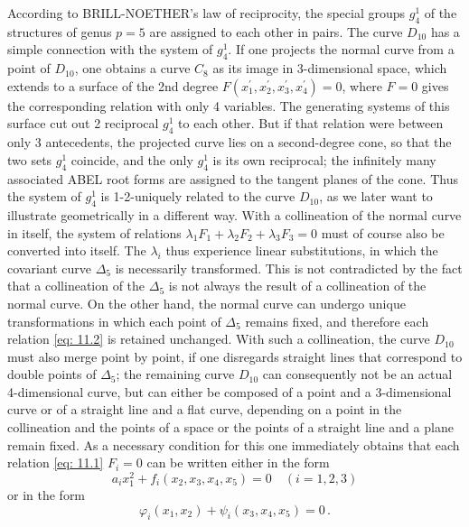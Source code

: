 \documentclass[leqno]{article}
\begin{document}
According to BRILL-NOETHER's law of reciprocity, the special groups $g_4^1$ of the structures of genus $p=5$ are assigned to each other in pairs. The curve $D_{10}$ has a simple connection with the system of $g_4^1$. If one projects the normal curve from a point of $D_{10}$, one obtains a curve $C_8$ as its image in 3-dimensional space, which extends to a surface of the 2nd degree $F(x_1^\prime, x_2^ \prime, x_3^\prime, x_4^\prime)=0$, where $F=0$ gives the corresponding relation with only 4 variables. The generating systems of this surface cut out 2 reciprocal $g_4^1$ to each other. But if that relation were between only 3 antecedents, the projected curve lies on a second-degree cone, so that the two sets $g_4^1$ coincide, and the only $g_4^1$ is its own reciprocal; the infinitely many associated ABEL root forms are assigned to the tangent planes of the cone. Thus the system of $g_4^1$ is 1-2-uniquely related to the curve $D_{10}$, as we later want to illustrate geometrically in a different way. With a collineation of the normal curve in itself, the system of relations $\lambda_1 F_1 + \lambda_2 F_2 + \lambda_3 F_3=0$ must of course also be converted into itself. The $\lambda_i$ thus experience linear substitutions, in which the covariant curve $\Delta_5$ is necessarily transformed. This is not contradicted by the fact that a collineation of the $\Delta_5$ is not always the result of a collineation of the normal curve. On the other hand, the normal curve can undergo unique transformations in which each point of $\Delta_5$ remains fixed, and therefore each relation \eqref{eq: 11.2} is retained unchanged. With such a collineation, the curve $D_{10}$ must also merge point by point, if one disregards straight lines that correspond to double points of $\Delta_5$; the remaining curve $D_{10}$ can consequently not be an actual 4-dimensional curve, but can either be composed of a point and a 3-dimensional curve or of a straight line and a flat curve, depending on a point in the collineation and the points of a space or the points of a straight line and a plane remain fixed. As a necessary condition for this one immediately obtains that each relation \eqref{eq: 11.1} $F_i=0$ can be written either in the form 
\begin{equation}\label{eq: 11.a}
a_i x_1^2 + f_i(x_2, x_3, x_4, x_5) = 0 \quad (i=1,2,3) \tag{a}
\end{equation} 
or in the form 
\begin{equation}\label{eq: 11.b}
\varphi_i(x_1, x_2) + \psi_i(x_3, x_4, x_5) = 0 \, . \tag{b}
\end{equation} 
\end{document}
